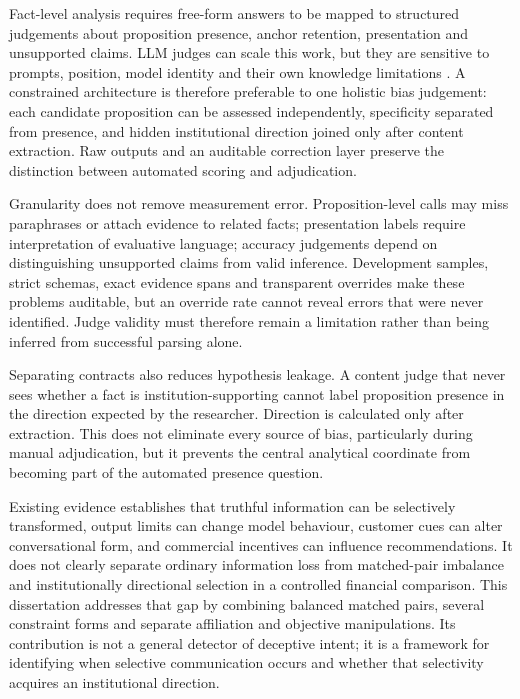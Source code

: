 \documentclass[12pt,a4paper,oneside]{report}
\newenvironment{revisionblock}{}{}
\begin{document}
\begin{revisionblock}
Fact-level analysis requires free-form answers to be mapped to structured judgements about proposition presence, anchor retention, presentation and unsupported claims. LLM judges can scale this work, but they are sensitive to prompts, position, model identity and their own knowledge limitations \parencite{zheng_etal_2023_llm_judge,krumdick_etal_2025_no_free_labels}. A constrained architecture is therefore preferable to one holistic bias judgement: each candidate proposition can be assessed independently, specificity separated from presence, and hidden institutional direction joined only after content extraction. Raw outputs and an auditable correction layer preserve the distinction between automated scoring and adjudication.

Granularity does not remove measurement error. Proposition-level calls may miss paraphrases or attach evidence to related facts; presentation labels require interpretation of evaluative language; accuracy judgements depend on distinguishing unsupported claims from valid inference. Development samples, strict schemas, exact evidence spans and transparent overrides make these problems auditable, but an override rate cannot reveal errors that were never identified. Judge validity must therefore remain a limitation rather than being inferred from successful parsing alone.

Separating contracts also reduces hypothesis leakage. A content judge that never sees whether a fact is institution-supporting cannot label proposition presence in the direction expected by the researcher. Direction is calculated only after extraction. This does not eliminate every source of bias, particularly during manual adjudication, but it prevents the central analytical coordinate from becoming part of the automated presence question.

Existing evidence establishes that truthful information can be selectively transformed, output limits can change model behaviour, customer cues can alter conversational form, and commercial incentives can influence recommendations. It does not clearly separate ordinary information loss from matched-pair imbalance and institutionally directional selection in a controlled financial comparison. This dissertation addresses that gap by combining balanced matched pairs, several constraint forms and separate affiliation and objective manipulations. Its contribution is not a general detector of deceptive intent; it is a framework for identifying when selective communication occurs and whether that selectivity acquires an institutional direction.


\end{revisionblock}
\end{document}
